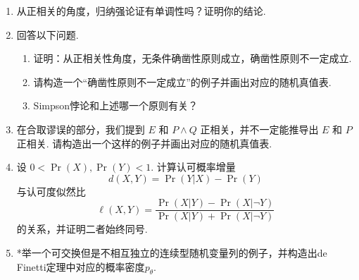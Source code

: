 \begin{enumerate}[wide, labelindent=0pt]
    \item \label{exercise:monotone-positive-related} 从正相关的角度，归纳强论证有单调性吗？证明你的结论.
    
    \item 回答以下问题. 
    \begin{enumerate}
        \item 证明：从正相关性角度，无条件确凿性原则成立，确凿性原则不一定成立.
        \item 请构造一个“确凿性原则不一定成立”的例子并画出对应的随机真值表.
        \item Simpson悖论和上述哪一个原则有关？
    \end{enumerate}

    \item 在合取谬误的部分，我们提到 $E$ 和 $P \wedge Q$ 正相关，并不一定能推导出 $E$ 和 $P$ 正相关. 请构造出一个这样的例子并画出对应的随机真值表.

    \item \label{exercise:admissible} 设 $0< \Pr(X),\Pr(Y) < 1$. 计算认可概率增量
    \begin{equation}
        d(X, Y) = \Pr(Y|X) - \Pr(Y)
    \end{equation}
    与认可度似然比
    \begin{equation}
        \ell(X, Y) = \frac{\Pr(X|Y) - \Pr(X|\lnot Y)}{\Pr(X|Y) + \Pr(X|\lnot Y)}
    \end{equation}
    的关系，并证明二者始终同号.

    \item *举一个可交换但是不相互独立的连续型随机变量列的例子，并构造出de Finetti定理中对应的概率密度$p_\theta$.
\end{enumerate}